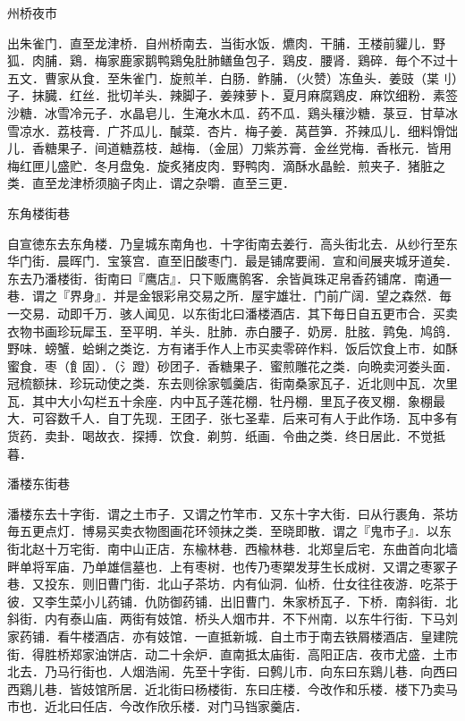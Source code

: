 \documentclass[]{article}
\begin{document}
州桥夜市

出朱雀门．直至龙津桥．自州桥南去．当街水饭．爊肉．干脯．王楼前貛儿．野狐．肉脯．鶏．梅家鹿家鹅鸭鶏兔肚肺鳝鱼包子．鶏皮．腰肾．鶏碎．毎个不过十五文．曹家从食．至朱雀门．旋煎羊．白肠．鲊脯．（火赞）冻鱼头．姜豉（枼刂）子．抹臓．红丝．批切羊头．辣脚子．姜辣萝卜．夏月麻腐鶏皮．麻饮细粉．素签沙糖．冰雪冷元子．水晶皂儿．生淹水木瓜．药不瓜．鶏头穰沙糖．菉豆．甘草冰雪凉水．荔枝膏．广芥瓜儿．醎菜．杏片．梅子姜．莴苣笋．芥辣瓜儿．细料馉饳儿．香糖果子．间道糖荔枝．越梅．（金屈）刀紫苏膏．金丝党梅．香枨元．皆用梅红匣儿盛贮．冬月盘兔．旋炙猪皮肉．野鸭肉．滴酥水晶鲙．煎夹子．猪脏之类．直至龙津桥须脑子肉止．谓之杂嚼．直至三更．

东角楼街巷

自宣徳东去东角楼．乃皇城东南角也．十字街南去姜行．高头街北去．从纱行至东华门街．晨晖门．宝箓宫．直至旧酸枣门．最是铺席要闹．宣和间展夹城牙道矣．东去乃潘楼街．街南曰『鹰店』．只下贩鹰鹘客．余皆眞珠疋帛香药铺席．南通一巷．谓之『界身』．并是金银彩帛交易之所．屋宇雄壮．门前广阔．望之森然．毎一交易．动即千万．骇人闻见．以东街北曰潘楼酒店．其下毎日自五更市合．买卖衣物书画珍玩犀玉．至平明．羊头．肚肺．赤白腰子．奶房．肚胘．鹑兔．鸠鸽．野味．螃蟹．蛤蜊之类讫．方有诸手作人上市买卖零碎作料．饭后饮食上市．如酥蜜食．枣（飠固）．（氵蹬）砂团子．香糖果子．蜜煎雕花之类．向晩卖河娄头面．冠梳额抹．珍玩动使之类．东去则徐家瓠羹店．街南桑家瓦子．近北则中瓦．次里瓦．其中大小勾栏五十余座．内中瓦子莲花棚．牡丹棚．里瓦子夜叉棚．象棚最大．可容数千人．自丁先现．王团子．张七圣辈．后来可有人于此作场．瓦中多有货药．卖卦．喝故衣．探搏．饮食．剃剪．纸画．令曲之类．终日居此．不觉抵暮．

潘楼东街巷

潘楼东去十字街．谓之土市子．又谓之竹竿市．又东十字大街．曰从行裹角．茶坊毎五更点灯．博易买卖衣物图画花环领抹之类．至晓即散．谓之『鬼市子』．以东街北赵十万宅街．南中山正店．东楡林巷．西楡林巷．北郑皇后宅．东曲首向北墙畔单将军庙．乃单雄信墓也．上有枣树．也传乃枣槊发芽生长成树．又谓之枣冢子巷．又投东．则旧曹门街．北山子茶坊．内有仙洞．仙桥．仕女往往夜游．吃茶于彼．又李生菜小儿药铺．仇防御药铺．出旧曹门．朱家桥瓦子．下桥．南斜街．北斜街．内有泰山庙．两街有妓馆．桥头人烟市井．不下州南．以东牛行街．下马刘家药铺．看牛楼酒店．亦有妓馆．一直抵新城．自土市于南去铁屑楼酒店．皇建院街．得胜桥郑家油饼店．动二十余炉．直南抵太庙街．高阳正店．夜市尤盛．土市北去．乃马行街也．人烟浩闹．先至十字街．曰鹩儿市．向东曰东鶏儿巷．向西曰西鶏儿巷．皆妓馆所居．近北街曰杨楼街．东曰庄楼．今改作和乐楼．楼下乃卖马市也．近北曰任店．今改作欣乐楼．对门马铛家羹店．
\end{document}
